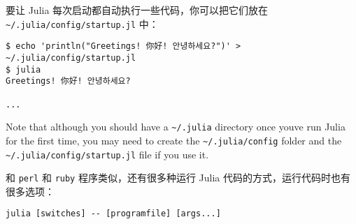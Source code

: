 要让 Julia 每次启动都自动执行一些代码，你可以把它们放在 \texttt{{\textasciitilde}/.julia/config/startup.jl} 中：




\begin{lstlisting}
$ echo 'println("Greetings! 你好! 안녕하세요?")' > ~/.julia/config/startup.jl
$ julia
Greetings! 你好! 안녕하세요?

...
\end{lstlisting}



Note that although you should have a \texttt{{\textasciitilde}/.julia} directory once you{\textquotesingle}ve run Julia for the first time, you may need to create the \texttt{{\textasciitilde}/.julia/config} folder and the \texttt{{\textasciitilde}/.julia/config/startup.jl} file if you use it.



和 \texttt{perl} 和 \texttt{ruby} 程序类似，还有很多种运行 Julia 代码的方式，运行代码时也有很多选项：




\begin{lstlisting}
julia [switches] -- [programfile] [args...]
\end{lstlisting}




